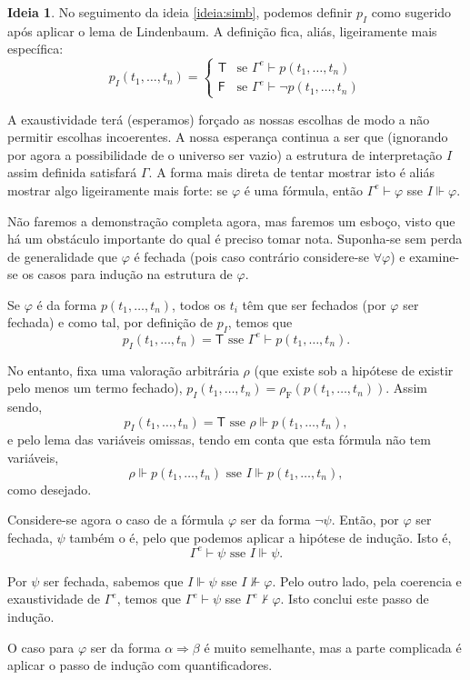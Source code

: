 \documentclass{report}
\theoremstyle{definition}
\newtheorem{ideia}{Ideia}
\theoremstyle{remark}
\newcommand{\F}{\mathrm{F}}
\newcommand{\lt}{\mathsf{T}}
\newcommand{\lf}{\mathsf{F}}
\newcommand{\imply}{\mathbin{\Rightarrow}}
\begin{document}
	\begin{ideia}
	No seguimento da ideia \ref{ideia:simb}, podemos definir $p_I$ como sugerido após aplicar o lema de Lindenbaum. A definição fica, aliás, ligeiramente mais específica:
	\[p_I(t_1, \dots, t_n) = \begin{cases}
	\lt &\text{se $\Gamma^e \vdash p(t_1, \dots, t_n)$}\\
	\lf &\text{se $\Gamma^e \vdash \neg p(t_1, \dots, t_n)$}
	\end{cases}\]
	
	A exaustividade terá (esperamos) forçado as nossas escolhas de modo a não permitir escolhas incoerentes. A nossa esperança continua a ser que (ignorando por agora a possibilidade de o universo ser vazio) a estrutura de interpretação $I$ assim definida satisfará $\Gamma$. A forma mais direta de tentar mostrar isto é aliás mostrar algo ligeiramente mais forte: se $\varphi$ é uma fórmula, então $\Gamma^e \vdash \varphi$ sse $I \Vdash \varphi$.
	
	Não faremos a demonstração completa agora, mas faremos um esboço, visto que há um obstáculo importante do qual é preciso tomar nota. Suponha-se sem perda de generalidade que $\varphi$ é fechada (pois caso contrário considere-se $\forall \varphi$) e examine-se os casos para indução na estrutura de $\varphi$.
	
	Se $\varphi$ é da forma $p(t_1, \dots, t_n)$, todos os $t_i$ têm que ser fechados (por $\varphi$ ser fechada) e como tal, por definição de $p_I$, temos que
	\[p_I(t_1, \dots, t_n) = \lt \text{ sse } \Gamma^e \vdash p(t_1, \dots, t_n).\]
	
	No entanto, fixa uma valoração arbitrária $\rho$ (que existe sob a hipótese de existir pelo menos um termo fechado), $p_I(t_1, \dots, t_n) = \rho_\F(p(t_1, \dots, t_n))$. Assim sendo,
	\[p_I(t_1, \dots, t_n) = \lt \text{ sse } \rho \Vdash p(t_1, \dots, t_n),\]
	e pelo lema das variáveis omissas, tendo em conta que esta fórmula não tem variáveis,
	\[\rho \Vdash p(t_1, \dots, t_n) \text{ sse } I \Vdash p(t_1, \dots, t_n),\]
	como desejado.
	
	Considere-se agora o caso de a fórmula $\varphi$ ser da forma $\neg \psi$. Então, por $\varphi$ ser fechada, $\psi$ também o é, pelo que podemos aplicar a hipótese de indução. Isto é,
	\[\Gamma^e \vdash \psi \text{ sse } I \Vdash \psi.\]
	
	Por $\psi$ ser fechada, sabemos que $I \Vdash \psi$ sse $I \nVdash \varphi$. Pelo outro lado, pela coerencia e exaustividade de $\Gamma^e$, temos que $\Gamma^e \vdash \psi$ sse $\Gamma^e \nvdash \varphi$. Isto conclui este passo de indução.
	
	O caso para $\varphi$ ser da forma $\alpha \imply \beta$ é muito semelhante, mas a parte complicada é aplicar o passo de indução com quantificadores.
	\end{ideia}
	
\end{document}
